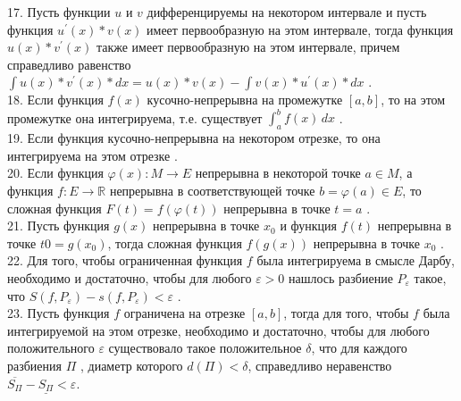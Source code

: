 \documentclass[12pt]{article}
\begin{document}
17. Пусть функции ${\displaystyle u}$ и ${\displaystyle v}$ дифференцируемы на некотором интервале и пусть функция ${\displaystyle u^{\prime}(x)*v(x)}$ имеет первообразную на этом интервале, тогда функция ${\displaystyle u(x)*v^{\prime}(x)}$ также имеет первообразную на этом интервале, причем справедливо равенство ${\displaystyle \int \limits u(x)*v^{\prime}(x)*dx=u(x)*v(x)-\int \limits v(x)*u^{\prime}(x)*dx}$ .\\

18. Если функция ${\displaystyle f(x)}$ кусочно-непрерывна на промежутке ${\displaystyle [a,b]}$, то на этом промежутке она интегрируема, т.е. существует ${\displaystyle \int _{a}^{b} f(x)\,dx}$ .\\

19. Если функция кусочно-непрерывна на некотором отрезке, то она интегрируема на этом отрезке .\\

20. Если функция ${\displaystyle \varphi(x)\colon M \to E}$ непрерывна в некоторой точке ${\displaystyle a \in M}$, а функция ${\displaystyle f \colon E \to \mathbb{R}}$ непрерывна в соответствующей точке ${\displaystyle b=\varphi(a) \in E}$, то сложная функция ${\displaystyle F(t)=f(\varphi(t))}$ непрерывна в точке ${\displaystyle t=a}$ .\\

21. Пусть функция ${\displaystyle g(x)}$  непрерывна в точке ${\displaystyle x_0}$ и функция ${\displaystyle f(t)}$  непрерывна в точке ${\displaystyle t0 = g(x_0)}$, тогда сложная функция  ${\displaystyle f(g(x))}$ непрерывна в точке ${\displaystyle x_0}$ .\\

22. Для того, чтобы ограниченная функция ${\displaystyle f}$ была интегрируема в смысле Дарбу, необходимо и достаточно, чтобы для любого ${\displaystyle \varepsilon>0}$ нашлось разбиение ${\displaystyle P_{\varepsilon}}$ такое, что ${\displaystyle S(f, P_{\varepsilon})-s(f, P_{\varepsilon})<\varepsilon}$ .\\

23. Пусть функция ${\displaystyle f}$ ограничена на отрезке ${\displaystyle \left [ {a,b} \right ]}$, тогда для того, чтобы ${\displaystyle f}$ была интегрируемой на этом отрезке, необходимо и достаточно, чтобы  для любого положительного ${\displaystyle \varepsilon}$ существовало такое положительное ${\displaystyle \delta}$, что для каждого разбиения ${\displaystyle \Pi}$ , диаметр которого ${\displaystyle d\left ( \Pi \right ) < \delta}$, справедливо неравенство ${\displaystyle {\overline {S_{\Pi}} } - {\underline {S_{\Pi}}} < \varepsilon}$.\\
\end{document}
